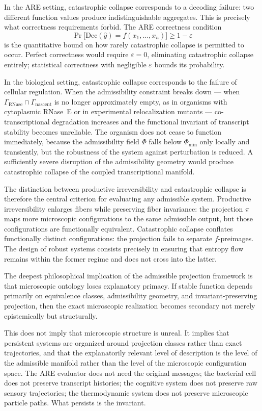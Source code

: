 \documentclass[12pt, a4paper]{article}
\theoremstyle{essaystyle}
\begin{document}
In the ARE setting, catastrophic collapse corresponds to a decoding failure: two
different function values produce indistinguishable aggregates. This is precisely
what correctness requirements forbid. The ARE correctness condition
\[
\Pr\bigl[\mathrm{Dec}(\hat{y}) = f(x_1, \ldots, x_n)\bigr] \geq 1 - \varepsilon
\]
is the quantitative bound on how rarely catastrophic collapse is permitted to occur.
Perfect correctness would require $\varepsilon = 0$, eliminating catastrophic
collapse entirely; statistical correctness with negligible $\varepsilon$ bounds
its probability.

In the biological setting, catastrophic collapse corresponds to the failure of
cellular regulation. When the admissibility constraint breaks down --- when
$\Gamma_{\mathrm{RNase}} \cap \Gamma_{\mathrm{nascent}}$ is no longer approximately
empty, as in organisms with cytoplasmic RNase~E or in experimental relocalization
mutants --- co-transcriptional degradation increases and the functional invariant
of transcript stability becomes unreliable. The organism does not cease to function
immediately, because the admissibility field $\Phi$ falls below $\Phi_{\min}$ only
locally and transiently, but the robustness of the system against perturbation is
reduced. A sufficiently severe disruption of the admissibility geometry would
produce catastrophic collapse of the coupled transcriptional manifold.

The distinction between productive irreversibility and catastrophic collapse is therefore
the central criterion for evaluating any admissible system. Productive irreversibility
enlarges fibers while preserving fiber invariance: the projection $\pi$ maps more
microscopic configurations to the same admissible output, but those configurations
are functionally equivalent. Catastrophic collapse conflates functionally distinct
configurations: the projection fails to separate $f$-preimages. The design of robust
systems consists precisely in ensuring that entropy flow remains within the former
regime and does not cross into the latter.

The deepest philosophical implication of the admissible projection framework is that
microscopic ontology loses explanatory primacy. If stable function depends primarily on
equivalence classes, admissibility geometry, and invariant-preserving projection, then
the exact microscopic realization becomes secondary not merely epistemically but
structurally.

This does not imply that microscopic structure is unreal. It implies that persistent
systems are organized around projection classes rather than exact trajectories, and that
the explanatorily relevant level of description is the level of the admissible manifold
rather than the level of the microscopic configuration space. The ARE evaluator does not
need the original messages; the bacterial cell does not preserve transcript histories;
the cognitive system does not preserve raw sensory trajectories; the thermodynamic
system does not preserve microscopic particle paths. What persists is the invariant.
\end{document}

